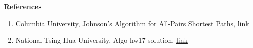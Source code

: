 \documentclass[12pt]{article}
\begin{document}
\begin{enumerate}[1.]
\begin{itemize}
\begin{enumerate}[1.]
            \bigskip
        \end{enumerate}
    \end{itemize}

    \bigskip

    \underline{\textbf{References}}

    \bigskip

    \begin{enumerate}[1)]
        \item Columbia University, Johnson’s Algorithm for All-Pairs Shortest Paths, \href{http://www.columbia.edu/~cs2035/courses/ieor6614.S16/johnson.pdf}{link}
        \item National Tsing Hua University, Algo hw17 solution, \href{http://hscc.cs.nthu.edu.tw/~sheujp/lecture_note/10al/hw17.pdf}{link}
    \end{enumerate}


\end{enumerate}
\end{document}
